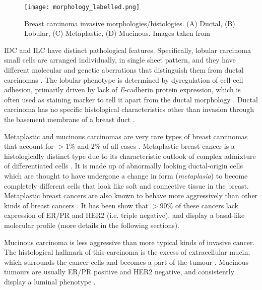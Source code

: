    
            \begin{figure}[!h]
            \centering
            \texttt{[image: morphology\_labelled.png]}
            \caption[Breast carcinoma invasive morphologies/histologies.]{Breast carcinoma invasive morphologies/histologies. (A) Ductal, (B) Lobular, (C) Metaplastic, (D) Mucinous. Images taken from \cite{Ramnani2016Webpathology.com:Images, Abdelmessieh2016BreastOverview}}
            \label{fig:histology}
            \end{figure} 
    
  IDC and ILC have distinct pathological features. Specifically, lobular carcinoma small cells are arranged individually, in single sheet pattern, and they have different molecular and genetic aberrations that distinguish them from ductal carcinomas \cite{weigelt2010molecular}. The lobular phenotype is determined by dyregulation of cell-cell adhesion, primarily driven by lack of \textit{E}-cadherin protein expression, which is often used as staining marker to tell it apart from the ductal morphology \cite{Abdelmessieh2016BreastOverview, Ciriello2015ComprehensiveCancer}. Ductal carcinoma has no specific histological characteristics other than invasion through the basement membrane of a breast duct \cite{Weigelt2008RefinementTypes}. 
   
    Metaplastic and mucinous carcinomas are very rare types of breast carcinomas that account for $>1\%$ and $2\%$ of all cases  \cite{Makki2015DiversityRelevance}. 
    Metaplastic breast cancer is a histologically distinct type due to its characteristic outlook of complex admixture of differentiated cells  \cite{Makki2015DiversityRelevance}. It is made up of abnormally looking ductal-origin cells which are thought to have undergone a change in form (\textit{metaplasia}) to become completely different cells that look like soft and connective tissue in the breast. Metaplastic breast cancers are also known to  behave more aggressively than other kinds of breast cancers \cite{schwartz2013metaplastic}. 
    It has been show that $>90\%$ of these cancers lack expression of ER/PR and HER2 (i.e. triple negative), and display a basal-like molecular profile \cite{Weigelt2010a} (more details in the following sections).


    Mucinous carcinoma is less aggressive than more typical kinds of invasive cancer. The histological hallmark of this carcinoma is the excess of extracellular mucin, which surrounds the cancer cells and becomes a part of the tumour \cite{dumitru2015mucinous}.  Mucinous tumours are usually ER/PR positive and HER2 negative, and consistently display a luminal phenotype \cite{Weigelt2010a}. 
    

